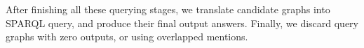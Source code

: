 

After finishing all these querying stages,
we translate candidate graphs into SPARQL query, and produce their final output answers.
Finally, we discard query graphs with zero outputs, or using overlapped mentions.









